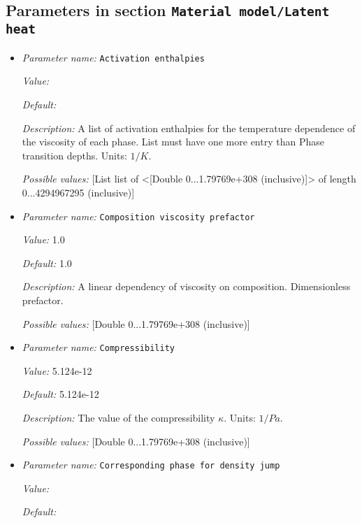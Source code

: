\subsection{Parameters in section \tt Material model/Latent heat}
\label{parameters:Material_20model/Latent_20heat}

\begin{itemize}
\item {\it Parameter name:} {\tt Activation enthalpies}


{\it Value:} 


{\it Default:} 


{\it Description:} A list of activation enthalpies for the temperature dependence of the viscosity of each phase. List must have one more entry than Phase transition depths. Units: $1/K$.


{\it Possible values:} [List list of <[Double 0...1.79769e+308 (inclusive)]> of length 0...4294967295 (inclusive)]
\item {\it Parameter name:} {\tt Composition viscosity prefactor}


{\it Value:} 1.0


{\it Default:} 1.0


{\it Description:} A linear dependency of viscosity on composition. Dimensionless prefactor.


{\it Possible values:} [Double 0...1.79769e+308 (inclusive)]
\item {\it Parameter name:} {\tt Compressibility}


{\it Value:} 5.124e-12


{\it Default:} 5.124e-12


{\it Description:} The value of the compressibility $\kappa$. Units: $1/Pa$.


{\it Possible values:} [Double 0...1.79769e+308 (inclusive)]
\item {\it Parameter name:} {\tt Corresponding phase for density jump}


{\it Value:} 


{\it Default:} 



\end{itemize}
